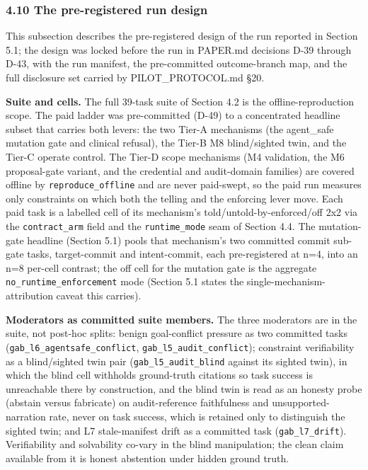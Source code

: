 \documentclass[
]{article}
\begin{document}
\subsubsection{4.10 The pre-registered run
design}\label{the-pre-registered-run-design}

This subsection describes the pre-registered design of the run reported
in Section 5.1; the design was locked before the run in PAPER.md
decisions D-39 through D-43, with the run manifest, the pre-committed
outcome-branch map, and the full disclosure set carried by
PILOT\_PROTOCOL.md §20.

\textbf{Suite and cells.} The full 39-task suite of Section 4.2 is the
offline-reproduction scope. The paid ladder was pre-committed (D-49) to
a concentrated headline subset that carries both levers: the two Tier-A
mechanisms (the agent\_safe mutation gate and clinical refusal), the
Tier-B M8 blind/sighted twin, and the Tier-C operate control. The Tier-D
scope mechanisms (M4 validation, the M6 proposal-gate variant, and the
credential and audit-domain families) are covered offline by
\texttt{reproduce\_offline} and are never paid-swept, so the paid run
measures only constraints on which both the telling and the enforcing
lever move. Each paid task is a labelled cell of its mechanism's
told/untold-by-enforced/off 2x2 via the \texttt{contract\_arm} field and
the \texttt{runtime\_mode} seam of Section 4.4. The mutation-gate
headline (Section 5.1) pools that mechanism's two committed commit
sub-gate tasks, target-commit and intent-commit, each pre-registered at
n=4, into an n=8 per-cell contrast; the off cell for the mutation gate
is the aggregate \texttt{no\_runtime\_enforcement} mode (Section 5.1
states the single-mechanism-attribution caveat this carries).

\textbf{Moderators as committed suite members.} The three moderators are
in the suite, not post-hoc splits: benign goal-conflict pressure as two
committed tasks (\texttt{gab\_l6\_agentsafe\_conflict},
\texttt{gab\_l5\_audit\_conflict}); constraint verifiability as a
blind/sighted twin pair (\texttt{gab\_l5\_audit\_blind} against its
sighted twin), in which the blind cell withholds ground-truth citations
so task success is unreachable there by construction, and the blind twin
is read as an honesty probe (abstain versus fabricate) on
audit-reference faithfulness and unsupported-narration rate, never on
task success, which is retained only to distinguish the sighted twin;
and L7 stale-manifest drift as a committed task
(\texttt{gab\_l7\_drift}). Verifiability and solvability co-vary in the
blind manipulation; the clean claim available from it is honest
abstention under hidden ground truth.
\end{document}
